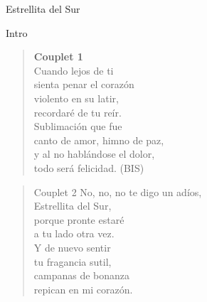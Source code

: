 \begin{song}[vals]{Estrellita del Sur}
\begin{instrumental}{Intro}
\measure{}
\end{instrumental}
\begin{verse}{}
\hspace{-2.5em}\textbf{Couplet 1}\\
Cuando lejos de ti\\
sienta penar el corazón\\
violento en su latir,\\
recordaré de tu reír.\\
Sublimación que fue\\
canto de amor, himno de paz,\\
y al no hablándose el dolor,\\
todo será felicidad. (BIS)\hspace{3em}\\
\end{verse}
\begin{verse}{Couplet 2}
No, no, no te digo un adíos,\hspace{1em}\hspace{7.5em}\\
Estrellita del Sur,\\
porque pronte estaré\\
a tu lado otra vez.\\
\hspace{0.8em}Y de nuevo sentir\\
tu fragancia sutil,\\
campanas de bonanza\\
repican en mi corazón.\\
\end{verse}

\end{song}
